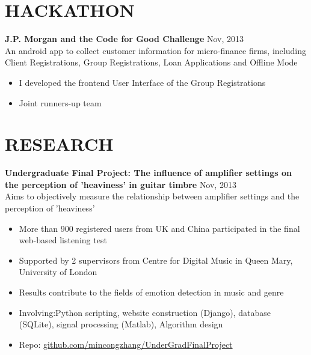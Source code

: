\documentclass[line,margin]{res}
\begin{document}
\begin{resume}
\section{HACKATHON} 
\renewcommand{\labelitemi}{-}

{\bf J.P. Morgan and the Code for Good Challenge}
\hfill{\textcolor[rgb]{0.7,0.7,0.7}{Nov, 2013}}\\
An android app to collect customer information for micro-ﬁnance ﬁrms, including Client Registrations, Group Registrations, Loan Applications and Offline Mode
\begin{itemize}\itemsep -2pt %
    \item I developed the frontend User Interface of the Group Registrations
    \item Joint runners-up team
\end{itemize}

\section{RESEARCH} 
{\bf Undergraduate Final Project: The influence of amplifier settings on the perception of 'heaviness' in guitar timbre}
\hfill{\textcolor[rgb]{0.7,0.7,0.7}{Nov, 2013}}\\
Aims to objectively measure the relationship between amplifier settings and the perception of 'heaviness'
\begin{itemize}\itemsep -2pt %
    \item More than 900 registered users from UK and China participated in the final web-based listening test
    \item Supported by 2 supervisors from Centre for Digital Music in Queen Mary, University of London
    \item Results contribute to the fields of emotion detection in music and genre
    \item Involving:Python scripting, website construction (Django), database (SQLite), signal processing (Matlab), Algorithm design
    \item Repo: \href{https://github.com/mincongzhang/UnderGradFinalProject}{github.com/mincongzhang/UnderGradFinalProject}
\end{itemize}


\end{resume}
\end{document}
